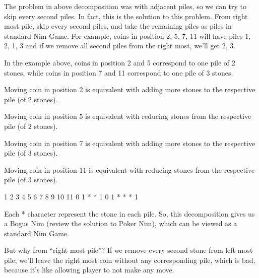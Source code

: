 	The problem in above decomposition was with adjacent piles, so we can try to skip every second piles. In fact, this is the solution to 		this problem. From right most pile, skip every second piles, and take the remaining piles as piles in standard Nim Game. For example, 		coins in position {2, 5, 7, 11} will have piles {1, 2, 1, 3} and if we remove all second piles from the right most, we’ll get {2, 3}.

	In the example above, coins in position 2 and 5 correspond to one pile of 2 stones, while coins in position 7 and 11 correspond to one 		pile of 3 stones.

	Moving coin in position 2 is equivalent with adding more stones to the respective pile (of 2 stones).

	Moving coin in position 5 is equivalent with reducing stones from the respective pile (of 2 stones).

	Moving coin in position 7 is equivalent with adding more stones to the respective pile (of 3 stones).

	Moving coin in position 11 is equivalent with reducing stones from the respective pile (of 3 stones).

	1 2 3 4 5 6 7 8 9 10 11
	0 1 * * 1 0 1 * *  *  1

	Each * character represent the stone in each pile. So, this decomposition gives us a Bogus Nim (review the solution to Poker Nim), which 		can be viewed as a standard Nim Game.

	But why from “right most pile”? If we remove every second stone from left most pile, we’ll leave the right most coin without any 		corresponding pile, which is bad, because it’s like allowing player to not make any move.

